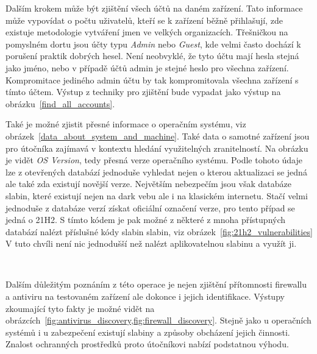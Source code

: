 Dalším krokem může být zjištění všech účtů na daném zařízení.
Tato informace může vypovídat o počtu uživatelů, kteří se k zařízení běžně přihlašují, zde existuje metodologie vytváření jmen ve velkých organizacích.
Třešničkou na pomyslném dortu jsou účty typu \textit{Admin} nebo \textit{Guest}, kde velmi často dochází k porušení praktik dobrých hesel.
Není neobvyklé, že tyto účtu mají hesla stejná jako jméno, nebo v případě účtů admin je stejné heslo pro všechna zařízení.
Kompromitace jediného admin účtu by tak kompromitovala všechna zařízení s tímto účtem.
Výstup z techniky pro zjištění bude vypadat jako výstup na obrázku~\ref{find_all_accounts}.


Také je možné zjistit přesné informace o operačním systému, viz obrázek~\ref{data_about_system_and_machine}.
Také data o samotné zařízení jsou pro útočníka zajímavá v kontextu hledání využitelných zranitelností.
Na obrázku je vidět \textit{OS Version}, tedy přesná verze operačního systému.
Podle tohoto údaje lze z otevřených databází jednoduše vyhledat nejen o kterou aktualizaci se jedná ale také zda existují novější verze.
Největším nebezpečím jsou však databáze slabin, které existují nejen na dark vebu ale i na klasickém internetu.
Stačí velmi jednoduše z databáze verzí získat oficiální označení verze, pro tento případ se jedná o 21H2\cite{win_versions}.
S tímto kódem je pak možné z některé z mnoha přístupných databází nalézt příslušné kódy slabin slabin, viz obrázek~\ref{fig:21h2_vulnerabilities}
V tuto chvíli není nic jednodušší než nalézt aplikovatelnou slabinu a využít ji.

~
~

Dalším důležitým poznáním z této operace je nejen zjištění přítomnosti firewallu a antiviru na testovaném zařízení ale dokonce i jejich identifikace.
Výstupy zkoumající tyto fakty je možné vidět na obrázcích~\ref{fig:antivirus_discovery,fig:firewall_discovery}.
Stejně jako u operačních systémů i u zabezpečení existují slabiny a způsoby obcházení jejich činnosti.
Znalost ochranných prostředků proto útočníkovi nabízí podstatnou výhodu.

